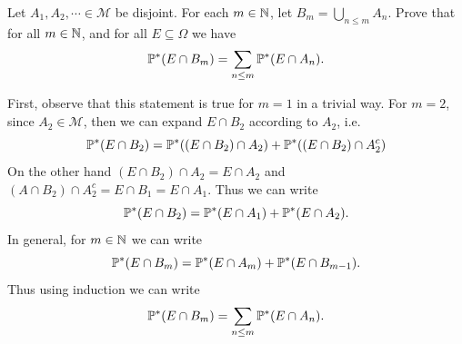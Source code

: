 \begin{problem}
	Let $ A_1,A_2,\cdots \in \mathcal{M} $ be disjoint. For each $ m\in \mathbb{N} $, let $ B_m = \bigcup_{n\leq m} A_n $. Prove that for all $ m\in \mathbb{N} $, and for all $ E \subseteq \Omega $ we have
	\[ \mathbb{P}^*(E\cap B_m) = \sum_{n\leq m} \mathbb{P}^*(E\cap A_n). \]
\end{problem}
\begin{solution}
	First, observe that this statement is true for $ m=1 $ in a trivial way. For $ m=2 $, since $ A_2 \in \mathcal{M} $, then we can expand $ E\cap B_2 $ according to $ A_2 $, i.e.
	\[ \mathbb{P}^*(E\cap B_2) = \mathbb{P}^*((E\cap B_2)\cap A_2) + \mathbb{P}^*((E \cap B_2)\cap A_2^c) \]
	On the other hand $ (E\cap B_2)\cap A_2 = E \cap A_2 $ and $ (A\cap B_2)\cap A_2^c = E\cap B_1 = E\cap A_1 $. Thus we can write
	\[ \mathbb{P}^*(E\cap B_2) = \mathbb{P}^*(E\cap A_1) + \mathbb{P}^*(E\cap A_2). \]
	In general, for $ m \in \mathbb{N} $ we can write
	\[ \mathbb{P}^*(E\cap B_m) = \mathbb{P}^*(E\cap A_m) + \mathbb{P}^*(E\cap B_{m-1}). \]
	Thus using induction we can write
	\[ \mathbb{P}^*(E\cap B_m) = \sum_{n\leq m }\mathbb{P}^*(E\cap A_n). \]
\end{solution}

